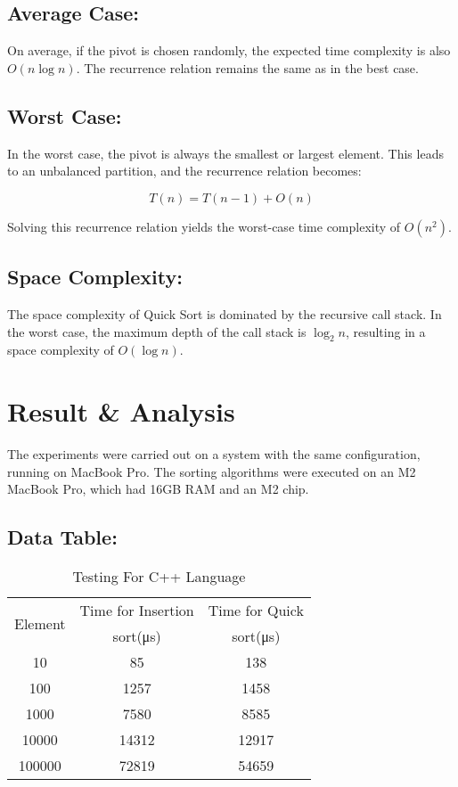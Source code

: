 \documentclass[twocolumn]{article}
\begin{document}
\subsection*{Average Case:}

On average, if the pivot is chosen randomly, the expected time complexity is also $O(n \log n)$. The recurrence relation remains the same as in the best case.

\subsection*{Worst Case:}

In the worst case, the pivot is always the smallest or largest element. This leads to an unbalanced partition, and the recurrence relation becomes:

\[
T(n) = T(n-1) + O(n)
\]

Solving this recurrence relation yields the worst-case time complexity of $O(n^2)$.

\subsection*{Space Complexity:}

The space complexity of Quick Sort is dominated by the recursive call stack. In the worst case, the maximum depth of the call stack is $\log_2 n$, resulting in a space complexity of $O(\log n)$.
\cite{1}\cite{6}\cite{7}
\section{Result \& Analysis}
The experiments were carried out on a system with the same configuration, running on MacBook Pro. The sorting algorithms were executed on an M2 MacBook Pro, which had 16GB RAM and an M2 chip.
\subsection*{Data Table:}
\begin{table}[h]
  \begin{tabular}{|c|c|c|}
    \hline
    \multirow{2}{*}{Element} & Time for Insertion  & Time for Quick \\
    & sort(\si{\micro\second}) & sort(\si{\micro\second}) \\
    \hline
    10 & 85 & 138 \\
    \hline
    100 & 1257 & 1458 \\
    \hline
    1000 & 7580 & 8585 \\
    \hline
    10000 & 14312 & 12917 \\
    \hline
    100000 & 72819 & 54659 \\
    \hline
  \end{tabular}
  \caption{Testing For C++ Language}
  \vspace*{0.8cm}
\end{table}
\end{document}

